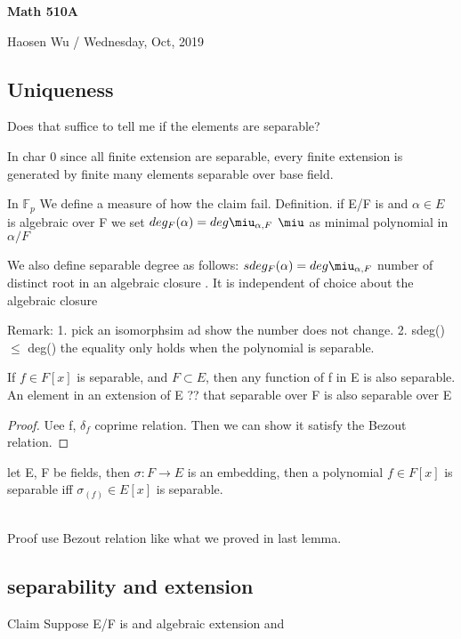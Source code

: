 \documentclass[11pt]{article}
\def\F{{\mathbb F}}
\theoremstyle{remark}
\begin{document}
\begin{center}
    \begin{Large} {\bf Math 510A}\\
    \end{Large}
    Haosen Wu  / Wednesday, Oct, 2019
\end{center}

\subsection*{Uniqueness}
Does that suffice to tell me if the elements are separable?

In char 0 since all finite extension are separable, every finite extension is generated by finite many elements separable over base field.

In $\F_p$ We define a measure of how the claim fail. 
Definition. if E/F is and $\alpha \in E$ is algebraic over F we set $deg_F(\alpha)=deg \miu_{\alpha,F}$ $\miu$ as minimal polynomial in $\alpha/F$

We also define separable degree as follows: $sdeg_F(\alpha)=deg \miu_{\alpha,F}$ number of distinct root in an algebraic closure . It is independent of choice about the algebraic closure

Remark: 1. pick an isomorphsim ad show the number does not change.
2. sdeg() $\leq$ deg() the equality only holds when the polynomial is separable.

\begin{Lem}
    If $f\in F[x]$ is separable, and $F\subset E $, then any function of f in E is also separable. An element in an extension of E ?? that separable over F is also separable over E
\begin{proof}
 Uee f, $\delta_{f}$ coprime relation. Then we can show it satisfy the Bezout relation.
\end{proof}
\end{Lem}

\begin{Lemma} 
let E, F be fields, then $\sigma:F\rightarrow E $ is an embedding, then a polynomial $f\in F[x]$ is separable iff $\sigma_(f) \in E[x]$ is separable.
\end{Lemma}
\\Proof use Bezout relation like what we proved in last lemma.

\subsection*{separability and extension}
Claim Suppose E/F is and algebraic extension and 
\end{document}
